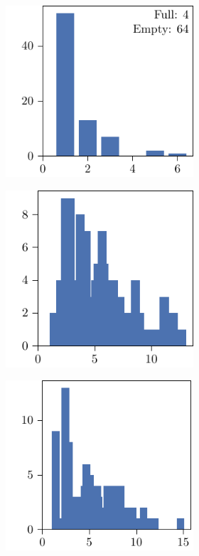\begin{figure}[p]
\begin{subfigure}{\textwidth}
\begin{subfigure}{\mymultiouter}
          \includegraphics[width=\mymultiinner]{figures/new/relaxed_common-wine-permutation-retraining}
    \end{subfigure}
  \end{subfigure}
  \centering
  \begin{subfigure}{\textwidth}
    \centering
    \begin{subfigure}{\mymultiouter}
        \centering
          \includegraphics[width=\mymultiinner]{figures/new/eucledian-wine-qlibra-permutation}
    \end{subfigure}
    \begin{subfigure}{\mymultiouter}
        \centering
          \includegraphics[width=\mymultiinner]{figures/new/eucledian-wine-qlibra-retraining}

\end{subfigure}
\end{subfigure}
\end{figure}
